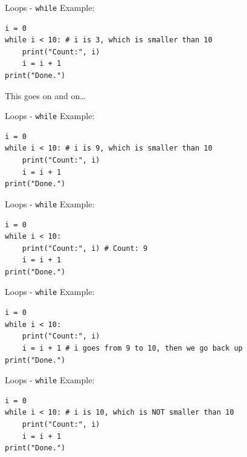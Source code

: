 \documentclass[dvipsnames, svgnames, x11names, handout]{beamer}
\begin{document}
\addtocounter{framenumber}{-1}

\begin{frame}[fragile]{Loops - \texttt{while}}
Example:
\begin{verbatim}
i = 0
while i < 10: # i is 3, which is smaller than 10
    print("Count:", i)
    i = i + 1
print("Done.")
\end{verbatim}

This goes on and on\dots
\end{frame}

\addtocounter{framenumber}{-1}

\begin{frame}[fragile]{Loops - \texttt{while}}
Example:
\begin{verbatim}
i = 0
while i < 10: # i is 9, which is smaller than 10
    print("Count:", i)
    i = i + 1
print("Done.")
\end{verbatim}
\end{frame}

\addtocounter{framenumber}{-1}

\begin{frame}[fragile]{Loops - \texttt{while}}
Example:
\begin{verbatim}
i = 0
while i < 10: 
    print("Count:", i) # Count: 9
    i = i + 1
print("Done.")
\end{verbatim}
\end{frame}

\addtocounter{framenumber}{-1}

\begin{frame}[fragile]{Loops - \texttt{while}}
Example:
\begin{verbatim}
i = 0
while i < 10: 
    print("Count:", i)
    i = i + 1 # i goes from 9 to 10, then we go back up
print("Done.")
\end{verbatim}
\end{frame}

\addtocounter{framenumber}{-1}

\begin{frame}[fragile]{Loops - \texttt{while}}
Example:
\begin{verbatim}
i = 0
while i < 10: # i is 10, which is NOT smaller than 10
    print("Count:", i)
    i = i + 1
print("Done.")
\end{verbatim}
\end{frame}
\end{document}
